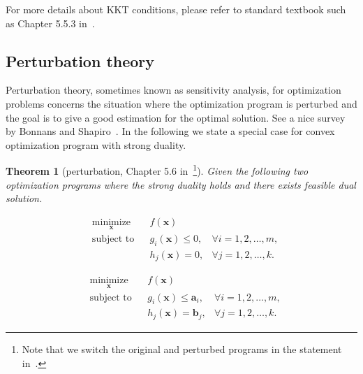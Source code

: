\documentclass[11pt]{article}
\newtheorem{theorem}{Theorem}
\theoremstyle{remark}
\theoremstyle{definition}
\newcommand{\bx}{\mathbf{x}}
\begin{document}
For more details about KKT conditions, please refer to standard textbook such as Chapter 5.5.3 in~\cite{boyd2004convex}.

\subsection{Perturbation theory}\label{sec:perturbation}
Perturbation theory, sometimes known as sensitivity analysis, for optimization problems concerns the situation where the optimization program is perturbed and the goal is to give a good estimation for the optimal solution. See a nice survey by Bonnans and Shapiro~\cite{bonnans1998optimization}. In the following we state a special case for convex optimization program with strong duality.

\begin{theorem}[perturbation, Chapter 5.6 in~\cite{boyd2004convex}\footnote{Note that we switch the original and perturbed programs in the statement in~\cite{boyd2004convex}.}]\label{thm:perturbation}
	Given the following two optimization programs where the strong duality holds and there exists feasible dual solution.\\
	\begin{minipage}{\linewidth}
		\begin{minipage}{0.5\linewidth}
			\begin{equation}\label{op:prelim perturbation-original}
			\begin{aligned}
			& \underset{\bx}{\text{minimize}}
			& & f(\bx) \\
			& \text{subject to}
			& & g_i(\bx)\leq0,&\forall i=1,2,\dots,m,\\
			& & & h_j(\bx)=0,&\forall j=1,2,\dots,k.
			\end{aligned}
			\end{equation}
		\end{minipage}
		\begin{minipage}{0.5\linewidth}
			\begin{equation}\label{op:prelim perturbation-perturbed}
			\begin{aligned}
			& \underset{\bx}{\text{minimize}}
			& & f(\bx) \\
			& \text{subject to}
			& & g_i(\bx)\leq \mathbf{a}_i,&\forall i=1,2,\dots,m,\\
			& & & h_j(\bx)=\mathbf{b}_j,&\forall j=1,2,\dots,k.
			\end{aligned}
			\end{equation}
		\end{minipage}
	\end{minipage}
	

\end{theorem}
\end{document}
